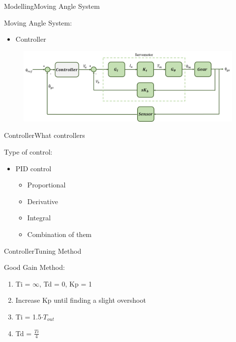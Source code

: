 \begin{frame}{Modelling}{Moving Angle System}
  \begin{block}{Moving Angle System:}
	  \begin{itemize}
	  	\item Controller
	  \end{itemize}
	  \begin{figure}
        \includegraphics[scale=0.26]{../report/figures/servo+gear+noise+controller.png}
      \end{figure}
  \end{block}
\end{frame}


\begin{frame}{Controller}{What controllers}
  \begin{block}{Type of control:}

	  \begin{itemize}
	  	\item PID control
	 	\begin{itemize}
	  	\item Proportional
	  	\item Derivative
	  	\item Integral
	  	\item Combination of them
	  \end{itemize}
	  \end{itemize}


  \end{block}
\end{frame}

\begin{frame}{Controller}{Tuning Method}
  \begin{block}{Good Gain Method:}
	  \begin{enumerate}
	  	\item Ti = $\infty$, Td = 0, Kp = 1
	  	\item Increase Kp until finding a slight overshoot
		\item Ti = 1.5$\cdot T_{out}$
		\item Td = $\frac{Ti}{4}$
	  \end{enumerate}
	  
  \end{block}
\end{frame}

